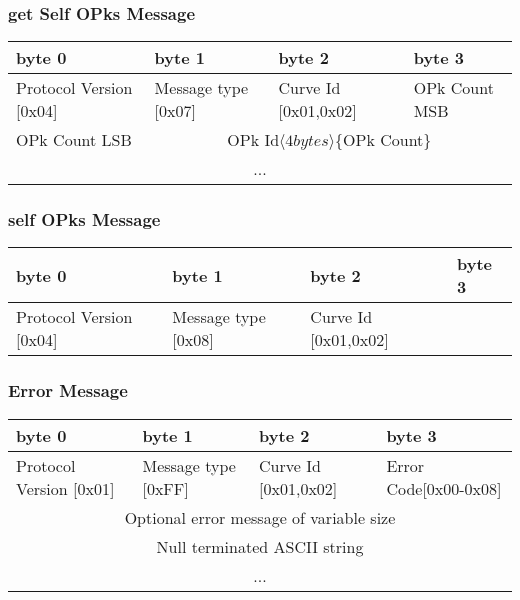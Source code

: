\documentclass[a4paper,11pt]{article}
\begin{document}
    \subsubsection{get Self OPks Message}
      \begin{center}
      \begin{tabular}{ | p{1.4in} | p{1.4in} | p{1.4in} | p{1.4in} |}
        \hline
        \cellcolor[gray]{0.85} byte 0 & \cellcolor[gray]{0.85} byte 1 & \cellcolor[gray]{0.85} byte 2 & \cellcolor[gray]{0.85}byte 3\\
        \hline
        Protocol Version [0x04] & Message type [0x07] & Curve Id [0x01,0x02] & OPk Count MSB\\
        \hline
        OPk Count LSB & \multicolumn{3}{|c|}{OPk Id$\langle 4bytes\rangle $\{OPk Count\}}\\
        \cline{1-1}
        \multicolumn{4}{|c|}{...}\\
        \hline
      \end{tabular}
      \end{center}

    \subsubsection{self OPks Message}
      \begin{center}
      \begin{tabular}{ | p{1.4in} | p{1.4in} | p{1.4in} | p{1.4in} |}
        \hline
        \cellcolor[gray]{0.85} byte 0 & \cellcolor[gray]{0.85} byte 1 & \cellcolor[gray]{0.85} byte 2 & \cellcolor[gray]{0.85}byte 3\\
        \hline
        Protocol Version [0x04] & Message type [0x08] & Curve Id [0x01,0x02] & \\
        \hline
      \end{tabular}
      \end{center}
      
    \subsubsection{Error Message}
      \begin{center}
      \begin{tabular}{ | p{1.4in} | p{1.4in} | p{1.4in} | p{1.4in} |}
        \hline
        \cellcolor[gray]{0.85} byte 0 & \cellcolor[gray]{0.85} byte 1 & \cellcolor[gray]{0.85} byte 2 & \cellcolor[gray]{0.85}byte 3\\
        \hline
        Protocol Version [0x01] & Message type [0xFF] & Curve Id [0x01,0x02] & Error Code[0x00-0x08]\\
        \hline
        \multicolumn{4}{|c|}{Optional error message of variable size}\\
        \multicolumn{4}{|c|}{Null terminated ASCII string}\\
        \multicolumn{4}{|c|}{...}\\
        \hline        
      \end{tabular}
      \end{center}
\end{document}
